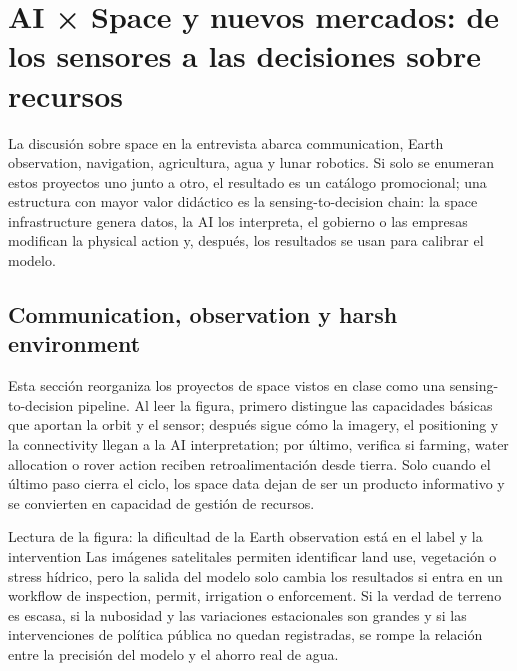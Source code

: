 \section{AI × Space y nuevos mercados: de los sensores a las decisiones sobre recursos}

La discusión sobre space en la entrevista abarca communication, Earth observation, navigation, agricultura, agua y lunar robotics. Si solo se enumeran estos proyectos uno junto a otro, el resultado es un catálogo promocional; una estructura con mayor valor didáctico es la sensing-to-decision chain: la space infrastructure genera datos, la AI los interpreta, el gobierno o las empresas modifican la physical action y, después, los resultados se usan para calibrar el modelo.

\subsection{Communication, observation y harsh environment}

Esta sección reorganiza los proyectos de space vistos en clase como una sensing-to-decision pipeline. Al leer la figura, primero distingue las capacidades básicas que aportan la orbit y el sensor; después sigue cómo la imagery, el positioning y la connectivity llegan a la AI interpretation; por último, verifica si farming, water allocation o rover action reciben retroalimentación desde tierra. Solo cuando el último paso cierra el ciclo, los space data dejan de ser un producto informativo y se convierten en capacidad de gestión de recursos.


\begin{knowledgebox}{Lectura de la figura: la dificultad de la Earth observation está en el label y la intervention}
Las imágenes satelitales permiten identificar land use, vegetación o stress hídrico, pero la salida del modelo solo cambia los resultados si entra en un workflow de inspection, permit, irrigation o enforcement. Si la verdad de terreno es escasa, si la nubosidad y las variaciones estacionales son grandes y si las intervenciones de política pública no quedan registradas, se rompe la relación entre la precisión del modelo y el ahorro real de agua.
\end{knowledgebox}

